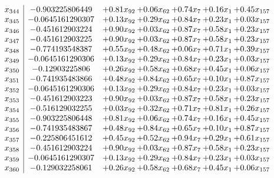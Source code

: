 \documentclass[8pt]{article}
\begin{document}
\[\begin{array}{c| c c@{\hskip 2pt} c@{\hskip 2pt} c@{\hskip 2pt} c@{\hskip 2pt} c@{\hskip 2pt} }
 x_{344}   &  -0.903225806449 & +  0.81 x_{92} & +  0.06 x_{62} & +  0.74 x_{7} & +  0.16 x_{1} & +  0.45 x_{157}\\
 x_{345}   &  -0.0645161290307 & +  0.13 x_{92} & +  0.29 x_{62} & +  0.84 x_{7} & +  0.23 x_{1} & +  0.03 x_{157}\\
 x_{346}   &  -0.451612903224 & +  0.90 x_{92} & +  0.03 x_{62} & +  0.87 x_{7} & +  0.58 x_{1} & +  0.23 x_{157}\\
 x_{347}   &  -0.451612903225 & +  0.90 x_{92} & +  0.03 x_{62} & +  0.87 x_{7} & +  0.58 x_{1} & +  0.23 x_{157}\\
 x_{348}   &  -0.774193548387 & +  0.55 x_{92} & +  0.48 x_{62} & +  0.06 x_{7} & +  0.71 x_{1} & +  0.39 x_{157}\\
 x_{349}   &  -0.0645161290306 & +  0.13 x_{92} & +  0.29 x_{62} & +  0.84 x_{7} & +  0.23 x_{1} & +  0.03 x_{157}\\
 x_{350}   &  -0.12903225806 & +  0.26 x_{92} & +  0.58 x_{62} & +  0.68 x_{7} & +  0.45 x_{1} & +  0.06 x_{157}\\
 x_{351}   &  -0.741935483866 & +  0.48 x_{92} & +  0.84 x_{62} & +  0.65 x_{7} & +  0.10 x_{1} & +  0.87 x_{157}\\
 x_{352}   &  -0.0645161290306 & +  0.13 x_{92} & +  0.29 x_{62} & +  0.84 x_{7} & +  0.23 x_{1} & +  0.03 x_{157}\\
 x_{353}   &  -0.451612903223 & +  0.90 x_{92} & +  0.03 x_{62} & +  0.87 x_{7} & +  0.58 x_{1} & +  0.23 x_{157}\\
 x_{354}   &  -0.516129032255 & +  0.03 x_{92} & +  0.32 x_{62} & +  0.71 x_{7} & +  0.81 x_{1} & +  0.26 x_{157}\\
 x_{355}   &  -0.903225806448 & +  0.81 x_{92} & +  0.06 x_{62} & +  0.74 x_{7} & +  0.16 x_{1} & +  0.45 x_{157}\\
 x_{356}   &  -0.741935483867 & +  0.48 x_{92} & +  0.84 x_{62} & +  0.65 x_{7} & +  0.10 x_{1} & +  0.87 x_{157}\\
 x_{357}   &  -0.225806451612 & +  0.45 x_{92} & +  0.52 x_{62} & +  0.94 x_{7} & +  0.29 x_{1} & +  0.61 x_{157}\\
 x_{358}   &  -0.451612903224 & +  0.90 x_{92} & +  0.03 x_{62} & +  0.87 x_{7} & +  0.58 x_{1} & +  0.23 x_{157}\\
 x_{359}   &  -0.0645161290307 & +  0.13 x_{92} & +  0.29 x_{62} & +  0.84 x_{7} & +  0.23 x_{1} & +  0.03 x_{157}\\
 x_{360}   &  -0.129032258061 & +  0.26 x_{92} & +  0.58 x_{62} & +  0.68 x_{7} & +  0.45 x_{1} & +  0.06 x_{157}\\

\end{array}\]
\end{document}
